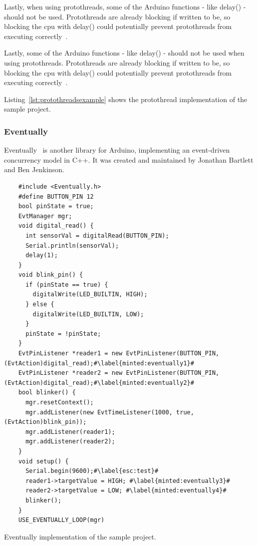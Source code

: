 Lastly, when using protothreads, some of the Arduino functions - like delay() - should not be used. Protothreads are already blocking if  written to be, so blocking the cpu with delay() could potentially prevent protothreads from executing correctly~\cite{AdamDunkelProtothreads}.

Lastly, some of the Arduino functions - like delay() - should not be used when using protothreads. Protothreads are already blocking if written to be, so blocking the \gls{cpu} with delay() could potentially prevent protothreads from executing correctly~\cite{AdamDunkelProtothreads}.

Listing~\ref{lst:protothreadsexample} shows the protothread implementation of the sample project.


\subsubsection{Eventually}
Eventually~\cite{bartlettEventually2022Bartlett} is another library for Arduino, implementing an event-driven concurrency model in C++. It was created and maintained by Jonathan Bartlett and Ben Jenkinson.


\begin{listing}[htb!]
  \begin{verbatim}
    #include <Eventually.h>
    #define BUTTON_PIN 12
    bool pinState = true;
    EvtManager mgr;
    void digital_read() {
      int sensorVal = digitalRead(BUTTON_PIN);
      Serial.println(sensorVal);
      delay(1);
    }
    void blink_pin() {
      if (pinState == true) {
        digitalWrite(LED_BUILTIN, HIGH);
      } else {
        digitalWrite(LED_BUILTIN, LOW);
      }
      pinState = !pinState;
    }
    EvtPinListener *reader1 = new EvtPinListener(BUTTON_PIN, (EvtAction)digital_read);#\label{minted:eventually1}#
    EvtPinListener *reader2 = new EvtPinListener(BUTTON_PIN, (EvtAction)digital_read);#\label{minted:eventually2}#
    bool blinker() {
      mgr.resetContext();
      mgr.addListener(new EvtTimeListener(1000, true, (EvtAction)blink_pin));
      mgr.addListener(reader1);
      mgr.addListener(reader2);
    }
    void setup() {
      Serial.begin(9600);#\label{esc:test}#
      reader1->targetValue = HIGH; #\label{minted:eventually3}#
      reader2->targetValue = LOW; #\label{minted:eventually4}#
      blinker();
    }
    USE_EVENTUALLY_LOOP(mgr)
  \end{verbatim}
  \caption{Eventually implementation of the sample project.}
  \label{lst:eventuallyexample}
\end{listing}


